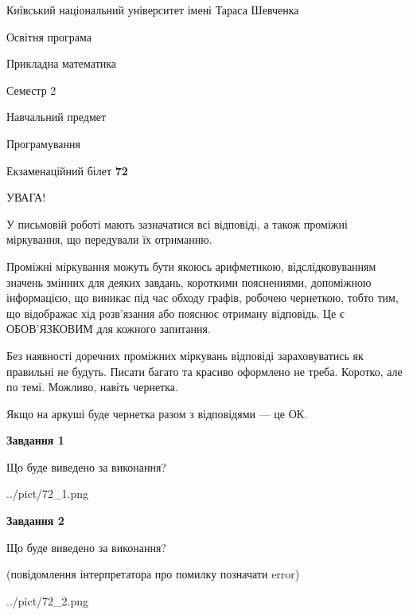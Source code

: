 \documentclass[12pt, ukrainian]{article}
\begin{document}
{{\begin {small}\par
{ \center  Київський національний університет імені Тараса Шевченка \par}
{\parbox {5 cm}{Освітня програма \hfill}{\parbox {7 cm}{Прикладна математика\hfill}}\parbox {6 cm}{\hfill Семестр 2}}\par
{\parbox {5 cm} {Навчальний предмет \hfill}\parbox {7 cm}{Програмування \hfill}\parbox {6cm}{\hfill}\par}\vspace{-7pt} \end{small}}{\center Екзаменаційний білет \No \textbf
{ 72 }\par}}
{
\begin {large}
УВАГА!

У письмовій роботі мають зазначатися всі відповіді, а також проміжні міркування, що передували їх отриманню.

Проміжні міркування можуть бути якоюсь арифметикою, відслідковуванням зна\-чень змінних для деяких завдань,
короткими поясненнями, допоміжною інформацією, що виникає під час обходу графів, робочею чернеткою,
тобто тим, що відображає хід розв’язання або пояснює отриману відповідь.
Це є ОБОВ’ЯЗКОВИМ для кожного запитання.

Без наявності доречних проміжних міркувань відповіді зараховуватись як правиль\-ні не будуть.
Писати багато та красиво оформлено не треба. Коротко, але по темі. Можли\-во, навіть чернетка.

Якщо на аркуші буде чернетка разом з відповідями --- це ОК.

\newpage

{\begin {center}\textbf{Завдання 1}\end {center}}\par
Що буде виведено за виконання?\par
\begin{center}
	{../pict/72_1.png}
\end{center}
\newpage

{\begin {center}\textbf{Завдання 2}\end {center}}\par
Що буде виведено за виконання?\par
 (повідомлення інтерпретатора про помилку позначати error)\par
\begin{center}
	{../pict/72_2.png}
\end{center}
\newpage


\end{large}}
\end{document}

